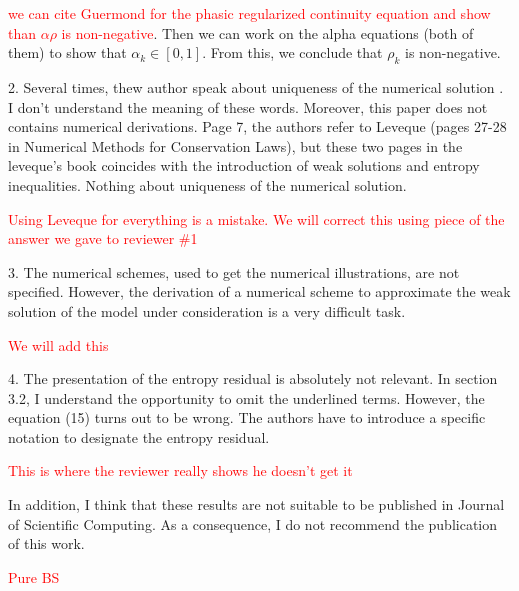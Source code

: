 \documentclass{article}
\newcommand{\tcr}[1]{\textcolor{red}{#1}}
\begin{document}
\tcr{we can cite Guermond for the phasic regularized continuity equation and show
than $\alpha \rho$ is non-negative}. Then we can work on the alpha equations (both of them) to show
that  $\alpha_k \in [0, 1]$. From this, we conclude that $\rho_k$ is non-negative.
\bigskip


{\color{blue}
2. Several times, thew author speak about uniqueness of the numerical solution
. I don’t understand the meaning of these words. Moreover, this
paper does not contains numerical derivations. Page 7, the authors refer
to Leveque (pages 27-28 in Numerical Methods for Conservation Laws),
but these two pages in the leveque’s book coincides with the introduction
of weak solutions and entropy inequalities. Nothing about uniqueness of
the numerical solution.}

\tcr{Using Leveque for everything is a mistake. We will correct this using
piece of the answer we gave to reviewer \#1}
\bigskip


{\color{blue}
3. The numerical schemes, used to get the numerical illustrations, are not
specified. However, the derivation of a numerical scheme to approximate
the weak solution of the model under consideration is a very difficult task.}

\tcr{We will add this}
\bigskip


{\color{blue}
4. The presentation of the entropy residual is absolutely not relevant. In
section 3.2, I understand the opportunity to omit the underlined terms.
However, the equation (15) turns out to be wrong. The authors have to
introduce a specific notation to designate the entropy residual.}

\tcr{This is where the reviewer really shows he doesn't get it}
\bigskip


{\color{blue}
In addition, I think that these results are not suitable to be published in Journal
of Scientific Computing. As a consequence, I do not recommend the publication
of this work.}

\tcr{Pure BS}
\bigskip
\end{document}
